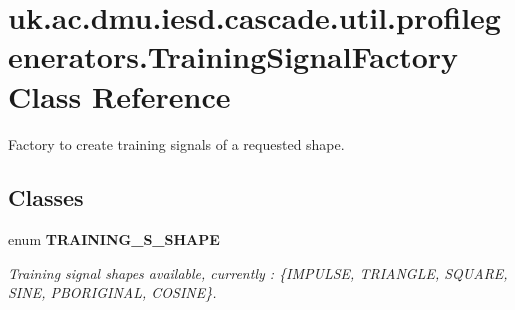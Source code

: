 \hypertarget{classuk_1_1ac_1_1dmu_1_1iesd_1_1cascade_1_1util_1_1profilegenerators_1_1_training_signal_factory}{\section{uk.\-ac.\-dmu.\-iesd.\-cascade.\-util.\-profilegenerators.\-Training\-Signal\-Factory Class Reference}
\label{classuk_1_1ac_1_1dmu_1_1iesd_1_1cascade_1_1util_1_1profilegenerators_1_1_training_signal_factory}
}


Factory to create training signals of a requested shape.  


\subsection*{Classes}
\begin{DoxyCompactItemize}
\item 
enum {\bfseries T\-R\-A\-I\-N\-I\-N\-G\-\_\-\-S\-\_\-\-S\-H\-A\-P\-E}
\begin{DoxyCompactList}\small\item\em Training signal shapes available, currently \-: \{I\-M\-P\-U\-L\-S\-E, T\-R\-I\-A\-N\-G\-L\-E, S\-Q\-U\-A\-R\-E, S\-I\-N\-E, P\-B\-O\-R\-I\-G\-I\-N\-A\-L, C\-O\-S\-I\-N\-E\}. \end{DoxyCompactList}\end{DoxyCompactItemize}
